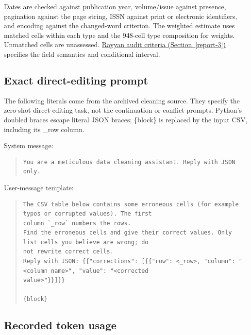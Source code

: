 \documentclass[10pt,a4paper]{article}
\begin{document}
Dates are checked against publication year, volume/issue against presence, pagination against the page string, ISSN against print or electronic identifiers, and encoding against the changed-word criterion. The weighted estimate uses matched cells within each type and the 948-cell type composition for weights. Unmatched cells are unassessed. \hyperlink{companion-3}{Rayyan audit criteria (Section~\ref{report-3})} specifies the field semantics and conditional interval.

\subsection{Exact direct-editing prompt}

The following literals come from the archived cleaning source. They specify the zero-shot direct-editing task, not the continuation or conflict prompts. Python's doubled braces escape literal JSON braces; {\ttfamily\small \{block\}} is replaced by the input CSV, including its {\ttfamily\small \_\allowbreak{}row} column.

System message:

\begin{quote}
\begin{Verbatim}[fontsize=\footnotesize,fontfamily=cmtt,formatcom={\fontencoding{OT1}\selectfont\def\textasciigrave{\char18}\def\textquotesingle{\char13}}]
You are a meticulous data cleaning assistant. Reply with JSON only.
\end{Verbatim}
\end{quote}

User-message template:

\begin{quote}
\begin{Verbatim}[fontsize=\footnotesize,fontfamily=cmtt,formatcom={\fontencoding{OT1}\selectfont\def\textasciigrave{\char18}\def\textquotesingle{\char13}}]
The CSV table below contains some erroneous cells (for example typos or corrupted values). The first
column `_row` numbers the rows.
Find the erroneous cells and give their correct values. Only list cells you believe are wrong; do
not rewrite correct cells.
Reply with JSON: {{"corrections": [{{"row": <_row>, "column": "<column name>", "value": "<corrected
value>"}}]}}

{block}
\end{Verbatim}
\end{quote}

\subsection{Recorded token usage}
\end{document}
